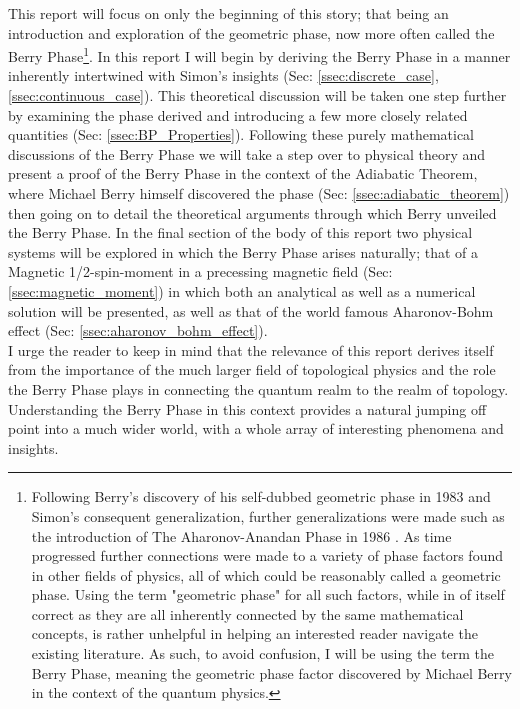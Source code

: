 \documentclass{article}
\begin{document}
This report will focus on only the beginning of this story; that being an introduction and exploration of the geometric phase, now more often called the Berry Phase\footnote{Following Berry's discovery of his self-dubbed geometric phase in 1983 and Simon's consequent generalization, further generalizations were made such as the introduction of The Aharonov-Anandan Phase in 1986 \cite{Aharonov1987}. As time progressed further connections were made to a variety of phase factors found in other fields of physics, all of which could be reasonably called a geometric phase. Using the term "geometric phase" for all such factors, while in of itself correct as they are all inherently connected by the same mathematical concepts, is rather unhelpful in helping an interested reader navigate the existing literature. As such, to avoid confusion, I will be using the term the Berry Phase, meaning the geometric phase factor discovered by Michael Berry in the context of the quantum physics.}. In this report I will begin by deriving the Berry Phase in a manner inherently intertwined with Simon's insights (Sec: \ref{ssec:discrete_case}, \ref{ssec:continuous_case}). This theoretical discussion will be taken one step further by examining the phase derived and introducing a few more closely related quantities (Sec: \ref{ssec:BP_Properties}). Following these purely mathematical discussions of the Berry Phase we will take a step over to physical theory and present a proof of the Berry Phase in the context of the Adiabatic Theorem, where Michael Berry himself discovered the phase (Sec: \ref{ssec:adiabatic_theorem}) then going on to detail the theoretical arguments through which Berry unveiled the Berry Phase. In the final section of the body of this report two physical systems will be explored in which the Berry Phase arises naturally; that of a Magnetic 1/2-spin-moment in a precessing magnetic field (Sec: \ref{ssec:magnetic_moment}) in which both an analytical as well as a numerical solution will be presented, as well as that of the world famous Aharonov-Bohm effect (Sec: \ref{ssec:aharonov_bohm_effect}).\\

I urge the reader to keep in mind that the relevance of this report derives itself from the importance of the much larger field of topological physics and the role the Berry Phase plays in connecting the quantum realm to the realm of topology. Understanding the Berry Phase in this context provides a natural jumping off point into a much wider world, with a whole array of interesting phenomena and insights.
\end{document}
